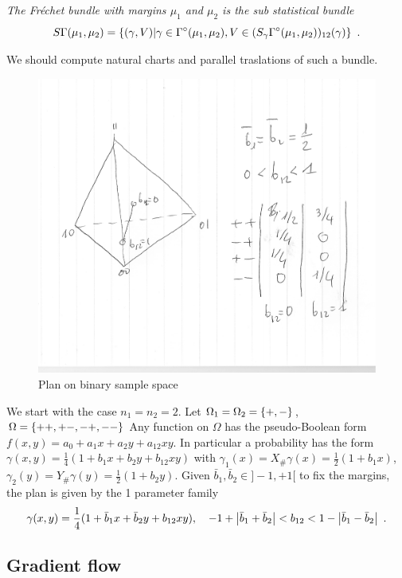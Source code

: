 \documentclass[runningheads]{llncs}
\begin{document}
%
\emph{The \emph{Fr\'echet bundle} with margins $\mu_1$ and $\mu_2$ is the sub statistical bundle
%
\begin{equation*}
  S\Gamma(\mu_1,\mu_2) = \left\{ (\gamma,V) \middle| \gamma\in\Gamma^\circ(\mu_1,\mu_2),V \in (S_\gamma\Gamma^\circ(\mu_1,\mu_2))_{12}(\gamma) \right\} \ .
\end{equation*}}

\begin{remark}
  We should compute natural charts and parallel traslations of such a bundle.
\end{remark}

\begin{exercise} 
%
  \begin{figure}[t]
    \centering
    \includegraphics[width=.4\textwidth]{plan2x2.pdf}
    \caption{Plan on binary sample space}
    \label{fig:1}
  \end{figure}
%
We start with the case $n_1=n_2=2$. Let $\Omega_1=\Omega_2=\left\{ +,- \right\}$, $\Omega=\left\{ ++,+-,-+,-- \right\}$ Any function on $\Omega$ has the pseudo-Boolean form $f(x,y)=a_0+a_1 x + a_2 y + a_{12} xy$. In particular a probability has the form $\gamma(x,y) = \frac14(1+b_1x+b_2y+b_{12}xy)$ with $\gamma_1(x) = X_{\#}\gamma (x)= \frac12(1+b_1x)$, $\gamma_2(y) = Y_\# \gamma(y) = \frac12(1+b_2y)$. Given $\bar b_1, \bar b_2 \in ]-1,+1[$ to fix the margins, the plan is given by the 1 parameter family 
%
  \begin{equation*}
    \gamma(x,y) = \frac14(1+\bar b_1x+\bar b_2y+b_{12}xy), \quad -1 + \left| \bar b_1+\bar b_2 \right| < b_{12} < 1 - \left| \bar b_1 - \bar b_2 \right| \ .
  \end{equation*}
\end{exercise}

\subsection{Gradient flow}
\end{document}
